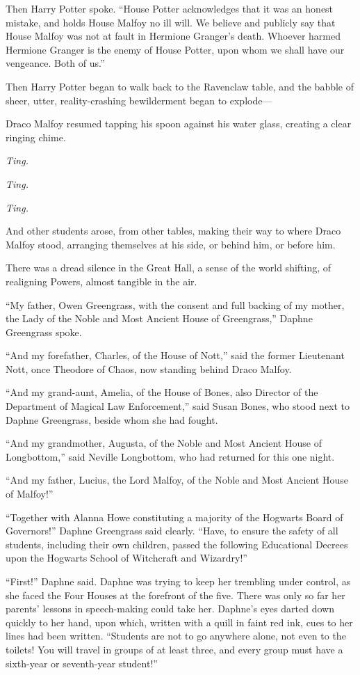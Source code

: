 Then Harry Potter spoke. “House Potter acknowledges that it was an honest mistake, and holds House Malfoy no ill will. We believe and publicly say that House Malfoy was not at fault in Hermione Granger’s death. Whoever harmed Hermione Granger is the enemy of House Potter, upon whom we shall have our vengeance. Both of us.”

Then Harry Potter began to walk back to the Ravenclaw table, and the babble of sheer, utter, reality-crashing bewilderment began to explode—

Draco Malfoy resumed tapping his spoon against his water glass, creating a clear ringing chime.

\emph{Ting.}

\emph{Ting.}

\emph{Ting.}

And other students arose, from other tables, making their way to where Draco Malfoy stood, arranging themselves at his side, or behind him, or before him.

There was a dread silence in the Great Hall, a sense of the world shifting, of realigning Powers, almost tangible in the air.

“My father, Owen Greengrass, with the consent and full backing of my mother, the Lady of the Noble and Most Ancient House of Greengrass,” Daphne Greengrass spoke.

“And my forefather, Charles, of the House of Nott,” said the former Lieutenant Nott, once Theodore of Chaos, now standing behind Draco Malfoy.

“And my grand-aunt, Amelia, of the House of Bones, also Director of the Department of Magical Law Enforcement,” said Susan Bones, who stood next to Daphne Greengrass, beside whom she had fought.

“And my grandmother, Augusta, of the Noble and Most Ancient House of Longbottom,” said Neville Longbottom, who had returned for this one night.

“And my father, Lucius, the Lord Malfoy, of the Noble and Most Ancient House of Malfoy!”

“Together with Alanna Howe constituting a majority of the Hogwarts Board of Governors!” Daphne Greengrass said clearly. “Have, to ensure the safety of all students, including their own children, passed the following Educational Decrees upon the Hogwarts School of Witchcraft and Wizardry!”

\later

“First!” Daphne said. Daphne was trying to keep her trembling under control, as she faced the Four Houses at the forefront of the five. There was only so far her parents’ lessons in speech-making could take her. Daphne’s eyes darted down quickly to her hand, upon which, written with a quill in faint red ink, cues to her lines had been written. “Students are not to go anywhere alone, not even to the toilets! You will travel in groups of at least three, and every group must have a sixth-year or seventh-year student!”

